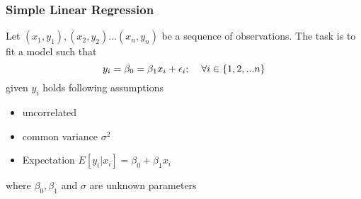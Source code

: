 \documentclass{article}
\newcommand\tab[1][0.4cm]{\hspace*{#1}}
\begin{document}
\subsubsection{Simple Linear Regression}
Let $(x_{1},y_{1}),(x_{2},y_{2})...(x_{n},y_{n})$ be a sequence of observations. The task is to fit a model such that
$$ y_{i} = \beta_{0} =\beta_{1}x_{i} + \epsilon_{i} ;\tab \forall i \in \{ 1,2,...n\} $$
given $y_{i}$ holds following assumptions
\begin{itemize}
    \item uncorrelated
    \item common variance $\sigma^{2}$
    \item Expectation $E[y_{i}|x_{i}] = \beta_{0} + \beta_{1} x_{i}$
\end{itemize}
where $\beta_{0},\beta_{1}$ and $\sigma$ are unknown parameters\\ 
\end{document}
